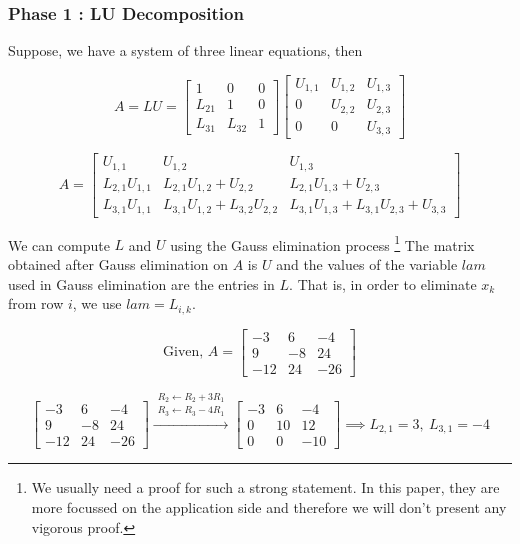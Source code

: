 \subsubsection{Phase 1 : LU Decomposition}
\begin{commentary}
	Suppose, we have a system of three linear equations, then

	\[ A = LU = \begin{bmatrix} 1 & 0 & 0 \\ L_{21} & 1 & 0 \\ L_{31} & L_{32} & 1 \end{bmatrix} \begin{bmatrix} U_{1,1} & U_{1,2} & U_{1,3} \\ 0 & U_{2,2} & U_{2,3} \\ 0 & 0 & U_{3,3} \end{bmatrix} \]

	\[ A= \begin{bmatrix} U_{1,1} & U_{1,2} & U_{1,3} \\ L_{2,1}U_{1,1} & L_{2,1}U_{1,2} + U_{2,2} & L_{2,1}U_{1,3} + U_{2,3} \\ L_{3,1}U_{1,1} & L_{3,1}U_{1,2} + L_{3,2}U_{2,2} & L_{3,1}U_{1,3} + L_{3,1}U_{2,3} + U_{3,3} \end{bmatrix} \]

	We can compute $L$ and $U$ using the Gauss elimination process
	\footnote{
		We usually need a proof for such a strong statement.
		In this paper, they are more focussed on the application side and therefore we will don't present any vigorous proof.
	}
	The matrix obtained after Gauss elimination on $A$ is $U$ and the values of the variable $lam$ used in Gauss elimination are the entries in $L$.
	That is, in order to eliminate $x_k$ from row $i$, we use $lam = L_{i,k}$.
\end{commentary}

	\[ \text{Given, }A = \begin{bmatrix} -3 & 6 & -4 \\ 9 & -8 & 24 \\ -12 & 24 & -26 \end{bmatrix} \]

	\[ \begin{bmatrix} -3 & 6 & -4 \\ 9 & -8 & 24 \\ -12 & 24 & -26 \end{bmatrix} \xrightarrow{\substack{R_2 \leftarrow R_2 + 3R_1 \\ R_3 \leftarrow R_3 - 4R_1}} \begin{bmatrix} -3 & 6 & -4 \\ 0 & 10 & 12 \\ 0 & 0 & -10 \end{bmatrix} \implies L_{2,1} = 3,\ L_{3,1} = -4  \]

